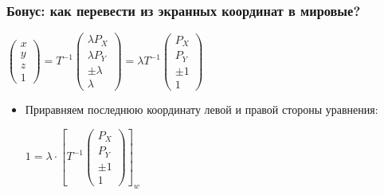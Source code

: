 \documentclass[10pt]{beamer}
\begin{document}
\begin{frame}[fragile]
\frametitle{Бонус: как перевести из экранных координат в мировые?}
\begin{center}
\begin{math}
\begin{pmatrix}x \\ y \\ z \\ 1\end{pmatrix} = T^{-1} \begin{pmatrix}\lambda P_X \\ \lambda P_Y \\ \pm \lambda \\ \lambda\end{pmatrix} = \lambda T^{-1} \begin{pmatrix}P_X \\ P_Y \\ \pm 1 \\ 1\end{pmatrix}
\end{math}
\end{center}
\pause
\begin{itemize}
\item Приравняем последнюю координату левой и правой стороны уравнения:
\begin{center}
\begin{math}
1 = \lambda \cdot
\left[
T^{-1} \begin{pmatrix}P_X \\ P_Y \\ \pm 1 \\ 1\end{pmatrix}
\right]_w
\end{math}
\end{center}
\end{itemize}
\end{frame}
\end{document}
